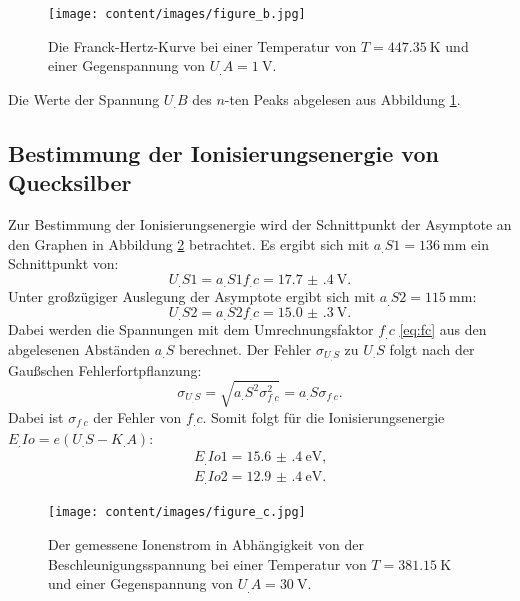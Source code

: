 \begin{figure}
\centering
\texttt{[image: content/images/figure\_b.jpg]}
\caption{Die Franck-Hertz-Kurve bei einer Temperatur von $T=\SI{447,35}{\kelvin}$ und einer Gegenspannung von $U_.A=\SI{1}{\volt}$.}
\label{fig:b}
\end{figure}

\begin{table}
\centering
\caption{Die Werte der Spannung $U_.B$ des $n$-ten Peaks abgelesen aus Abbildung \ref{fig:b}.}

\label{tab:FranckHertz}
\end{table}

\subsection{Bestimmung der Ionisierungsenergie von Quecksilber}

Zur Bestimmung der Ionisierungsenergie wird der Schnittpunkt der Asymptote an den Graphen in Abbildung \ref{fig:c} betrachtet.
Es ergibt sich mit $a_.{S1} = \SI{136}{\milli\metre}$ ein Schnittpunkt von:
\[
U_.{S1} = a_.{S1}f_.c = \SI{17.7(4)}{\volt}\text{.}
\]
Unter großzügiger Auslegung der Asymptote ergibt sich mit $a_.{S2} = \SI{115}{\milli\metre}$:
\[
U_.{S2} = a_.{S2}f_.c = \SI{15.0(3)}{\volt}\text{.}
\]
Dabei werden die Spannungen mit dem Umrechnungsfaktor $f_.c$ \eqref{eq:fc} aus den abgelesenen Abständen $a_.S$ berechnet. Der Fehler $\sigma_{U_.S}$ zu $U_.S$ folgt nach der Gaußschen Fehlerfortpflanzung:
\[
\sigma_{U_.S} = \sqrt{a_.S^2\sigma_{f_.{c}}^2} = a_.S\sigma_{f_.{c}}\text{.}
\]
Dabei ist $\sigma_{f_.{c}}$ der Fehler von $f_.{c}$.
Somit folgt für die Ionisierungsenergie $E_.{Io} = e(U_.S-K_.A)$:
\begin{align*}
E_.{Io1} = \SI{15.6(4)}{\electronvolt}\text{,}\\
E_.{Io2} = \SI{12.9(4)}{\electronvolt}\text{.}
\end{align*}

\begin{figure}
\centering
\texttt{[image: content/images/figure\_c.jpg]}
\caption{Der gemessene Ionenstrom in Abhängigkeit von der Beschleunigungsspannung bei einer Temperatur von $T=\SI{381,15}{\kelvin}$ und einer Gegenspannung von $U_.A=\SI{30}{\volt}$.}
\label{fig:c}
\end{figure}